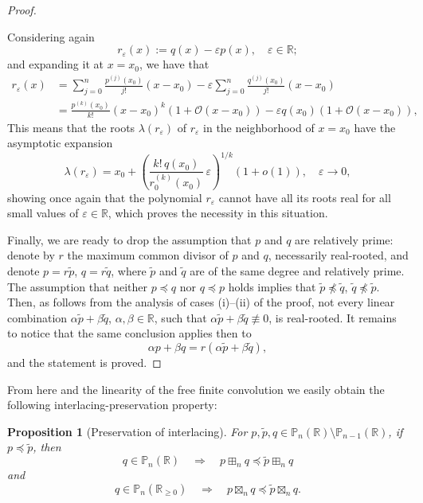 \documentclass[reqno,11pt]{amsart}
\newtheorem{proposition}[theorem]{Proposition}
\theoremstyle{remark}
\renewcommand{\P}{\mathbb{P}}
\newcommand{\R}{\mathbb{R}}
\newcommand{\pp}{\mathbb{P}}
\newcommand{\rr}{\mathbb{R}}
\begin{document}
\begin{proof}
\begin{enumerate}[(i)]
Considering again 
$$
r_\varepsilon(x):= q(x) -  \varepsilon p(x), \quad \varepsilon\in \R;
$$
and expanding it at $x=x_0$, we have that 
\begin{align*}
r_\varepsilon(x) & = \sum_{j=0}^n \frac{p^{(j)}(x_0)}{j!}(x-x_0) - \varepsilon \sum_{j=0}^n \frac{q^{(j)}(x_0)}{j!}(x-x_0)  \\
&= \frac{p^{(k)}(x_0)}{k!}(x-x_0)^{k} \left( 1+ \mathcal O(x-x_0)\right) - \varepsilon q(x_0) \left( 1+ \mathcal O(x-x_0)\right),
\end{align*}
This means that the roots $\lambda(r_\varepsilon)$ of $r_\varepsilon$ in the neighborhood of $x=x_0$ have the asymptotic expansion
$$
\lambda(r_\varepsilon) = x_0 + \left(\frac{k!\,  q(x_0)}{r_0^{(k)}(x_0)} \, \varepsilon \right)^{1/k} \left( 1+ o(1)\right), \quad \varepsilon\to 0,
$$
showing once again that the polynomial $r_\varepsilon$ cannot have all its roots real for all small values of $\varepsilon\in \R$, which proves the necessity in this situation.
\end{enumerate}

Finally, we are ready to drop the assumption that $p$ and $q$ are relatively prime: denote by $r$ the maximum common divisor of $p$ and $q$, necessarily real-rooted, and denote $p=r \widetilde p$, $q=r \widetilde q$, where $\widetilde p$ and $\widetilde q$ are of the same degree and relatively prime. The assumption that neither $p \preccurlyeq q$ nor $q \preccurlyeq p$ holds implies that  $\widetilde p \not \preccurlyeq \widetilde q$,  $\widetilde q \not \preccurlyeq \widetilde p$. Then, as follows from the analysis of cases (i)--(ii) of the proof, not every linear combination $\alpha\widetilde p+\beta\widetilde q$,  $\alpha,\beta\in \rr$, such that $\alpha\widetilde p+\beta\widetilde q \not \equiv 0 $, is real-rooted. It remains to notice that the same conclusion applies then to  
$$
\alpha  p+\beta  q = r\left( \alpha\widetilde p+\beta\widetilde q\right),
$$
and the statement is proved.
\end{proof}

From here and the linearity of the free finite convolution we easily obtain the following interlacing-preservation property:
\begin{proposition}[Preservation of interlacing]
\label{lem:preservinginterlacingMult}
For $p, \tilde p, q\in \pp_n(\rr)\setminus \pp_{n-1}(\rr)$,  
if  $p \preccurlyeq \widetilde{p}$, then %
$$
q \in \P_n(\R) \quad  \Rightarrow \quad p\boxplus_n q \preccurlyeq \widetilde{p} \boxplus_n q
$$
and 
$$
q \in \P_n(\R_{\ge 0}) \quad  \Rightarrow \quad p\boxtimes_n q \preccurlyeq \widetilde{p} \boxtimes_n q.
$$
\end{proposition}
\end{document}
